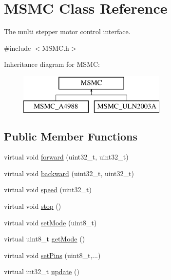 \hypertarget{class_m_s_m_c}{\section{M\+S\+M\+C Class Reference}
\label{class_m_s_m_c}
}


The multi stepper motor control interface.  




{\ttfamily \#include $<$M\+S\+M\+C.\+h$>$}

Inheritance diagram for M\+S\+M\+C\+:\begin{figure}[H]
\begin{center}
\leavevmode
\includegraphics[height=2.000000cm]{class_m_s_m_c}
\end{center}
\end{figure}
\subsection*{Public Member Functions}
\begin{DoxyCompactItemize}
\item 
virtual void \hyperlink{class_m_s_m_c_a62615946a227d18ea3fc2f1329688d1f}{forward} (uint32\+\_\+t, uint32\+\_\+t)
\item 
virtual void \hyperlink{class_m_s_m_c_a389bfe7f7d05083cb4e95d73128c1c87}{backward} (uint32\+\_\+t, uint32\+\_\+t)
\item 
virtual void \hyperlink{class_m_s_m_c_a065e48c8e8f3b513bf6694e8eb1b28d5}{speed} (uint32\+\_\+t)
\item 
virtual void \hyperlink{class_m_s_m_c_a0b44d0a659550ba754bf9212294ba6d5}{stop} ()
\item 
virtual void \hyperlink{class_m_s_m_c_a85bd4abf542aecdf24bb90b9ea2a47e9}{set\+Mode} (uint8\+\_\+t)
\item 
virtual uint8\+\_\+t \hyperlink{class_m_s_m_c_a5a1c4ee3498360946cc8e8d39436d0e3}{get\+Mode} ()
\item 
virtual void \hyperlink{class_m_s_m_c_a986baf46421830593e68d220d0453419}{set\+Pins} (uint8\+\_\+t,...)
\item 
virtual int32\+\_\+t \hyperlink{class_m_s_m_c_a44ca6bc355a269543606dd4eeb7ed06e}{update} ()
\end{DoxyCompactItemize}


